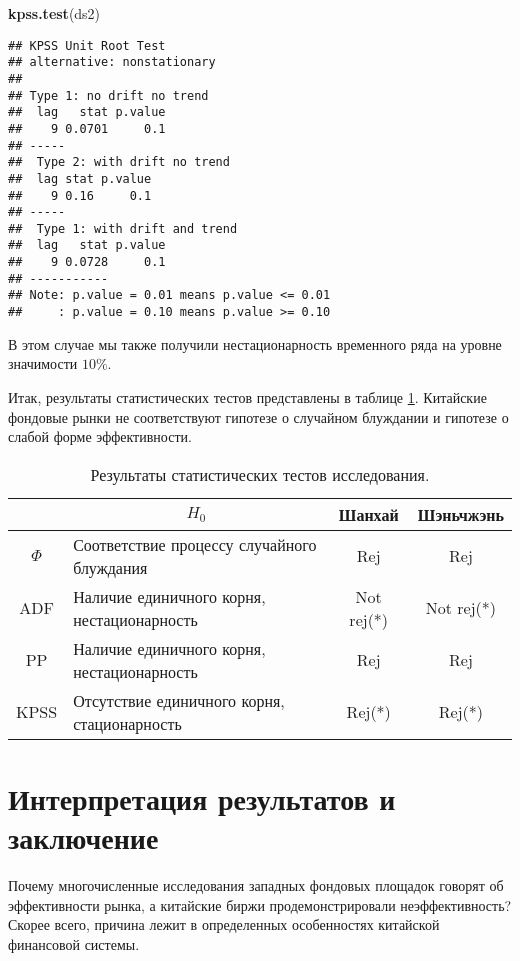 \documentclass[a4paper,12pt]{article}
\newenvironment{Shaded}{\begin{snugshade}}{\end{snugshade}}
\newcommand{\KeywordTok}[1]{\textcolor[rgb]{0.13,0.29,0.53}{\textbf{#1}}}
\newcommand{\NormalTok}[1]{#1}
\begin{document}
\begin{Shaded}
\begin{Highlighting}[]
\KeywordTok{kpss.test}\NormalTok{(ds2)}
\end{Highlighting}
\end{Shaded}

\begin{multicols}{2}
  \begin{Verbatim}[fontsize=\small]
## KPSS Unit Root Test
## alternative: nonstationary
##
## Type 1: no drift no trend
##  lag   stat p.value
##    9 0.0701     0.1
## -----
##  Type 2: with drift no trend
##  lag stat p.value
##    9 0.16     0.1
## -----
##  Type 1: with drift and trend
##  lag   stat p.value
##    9 0.0728     0.1
## -----------
## Note: p.value = 0.01 means p.value <= 0.01
##     : p.value = 0.10 means p.value >= 0.10
\end{Verbatim}
\end{multicols}

В этом случае мы также получили нестационарность временного ряда на уровне значимости $10\%$.

Итак, результаты статистических тестов представлены в таблице \ref{tab:modres}. Китайские фондовые рынки не соответствуют гипотезе о случайном блуждании и гипотезе о слабой форме эффективности.

\begin{table}
\centering
\caption{Результаты статистических тестов исследования.}
\label{tab:modres}
\begin{tabular}{|c|l|c|c|}
\hline
\multicolumn{1}{|l|}{} & \multicolumn{1}{c|}{$H_0$} & Шанхай & Шэньчжэнь \\ \hline
$\Phi$ & Соответствие процессу случайного блуждания & Rej & Rej \\ \hline
ADF & Наличие единичного корня, нестационарность & Not rej(*) & Not rej(*) \\ \hline
PP & Наличие единичного корня, нестационарность & Rej & Rej \\ \hline
KPSS & Отсутствие единичного корня, стационарность & Rej(*) & Rej(*) \\ \hline
\end{tabular}
\end{table}
\newpage
\section{Интерпретация результатов и заключение}\label{sec:res}

Почему многочисленные исследования западных фондовых площадок говорят об эффективности рынка, а китайские биржи продемонстрировали неэффективность? Скорее всего, причина лежит в определенных особенностях китайской финансовой системы.
\end{document}
